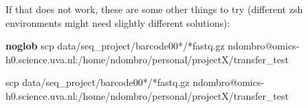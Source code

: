 \documentclass[
  letterpaper,
  DIV=11,
  numbers=noendperiod]{scrreprt}
\newenvironment{Shaded}{}{}
\newcommand{\ExtensionTok}[1]{\textcolor[rgb]{0.84,0.23,0.29}{\textbf{#1}}}
\newcommand{\FunctionTok}[1]{\textcolor[rgb]{0.44,0.26,0.76}{#1}}
\newcommand{\NormalTok}[1]{\textcolor[rgb]{0.14,0.16,0.18}{#1}}
\newcommand{\PreprocessorTok}[1]{\textcolor[rgb]{0.84,0.23,0.29}{#1}}
\newcommand{\StringTok}[1]{\textcolor[rgb]{0.01,0.18,0.38}{#1}}
\begin{document}
\begin{tcolorbox}
If that does not work, these are some other things to try (different zsh
environments might need slightly different solutions):

\begin{Shaded}
\begin{Highlighting}[]
\ExtensionTok{noglob}\NormalTok{ scp data/seq\_project/barcode00}\PreprocessorTok{*}\NormalTok{/}\PreprocessorTok{*}\NormalTok{fastq.gz ndombro@omics{-}h0.science.uva.nl:/home/ndombro/personal/projectX/transfer\_test}

\FunctionTok{scp} \StringTok{\textquotesingle{}data/seq\_project/barcode00*/*fastq.gz\textquotesingle{}}\NormalTok{ ndombro@omics{-}h0.science.uva.nl:/home/ndombro/personal/projectX/transfer\_test}
\end{Highlighting}
\end{Shaded}

\end{tcolorbox}
\end{document}
